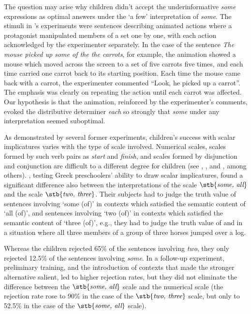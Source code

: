 \documentclass[output=paper]{langscibook}
\begin{document}
The question may arise why children didn't accept the underinformative \textit{some} expressions as optimal answers under the ‘a few’ interpretation of \textit{some}. The stimuli in \citeauthor{katsos2011pragmatic}'s experiments were sentences describing animated actions where a protagonist manipulated members of a set one by one, with each action acknowledged by the experimenter separately. In the case of the sentence \textit{The mouse picked up some of the the carrots}, for example, the animation showed a mouse which moved across the screen to a set of five carrots five times, and each time carried one carrot back to its starting position. Each time the mouse came back with a carrot, the experimenter commented ``Look, he picked up a carrot''. The emphasis was clearly on repeating the action until each carrot was affected. Our hypothesis is that the animation, reinforced by the experimenter's comments, evoked the distributive determiner \textit{each} so strongly that \textit{some} under any interpretation seemed suboptimal.

As demonstrated by several former experiments, children's success with scalar implicatures varies with the type of scale involved. Numerical scales, scales \linebreak formed by such verb pairs as \textit{start} and \textit{finish}, and scales formed by disjunction and conjunction are difficult to a different degree for children (see \citealt{noveck2001children}, \citealt{papafragou2003scalar}, and \citealt{barner2011accessing}, among others). \citet{papafragou2003scalar}, testing Greek preschoolers' ability to draw scalar implicatures, found a significant difference also between the interpretations of the scale $\stb{\textit{some, all}}$ and the scale $\stb{\textit{two, three}}$. Their subjects had to judge the truth value of sentences involving `some (of)' in contexts which satisfied the semantic content of `all (of)', and sentences involving `two (of)' in contexts which satisfied the semantic content of `three (of)', e.g., they had to judge the truth value of  and  in a situation where all three members of a group of three horses jumped over a log. 

\eal
{}
\zl

\noindent Whereas the children rejected 65\% of the sentences involving \textit{two}, they only rejected 12.5\% of the sentences involving \textit{some}. In a follow-up experiment, preliminary training, and the introduction of contexts that made the stronger alternative salient, led to higher rejection rates, but they did not eliminate the difference between the $\stb{\textit{some, all}}$ scale and the numerical scale (the rejection rate rose to 90\% in the case of the $\stb{\textit{two, three}}$ scale, but only to 52.5\% in the case of the $\stb{\textit{some, all}}$ scale). 
\end{document}
